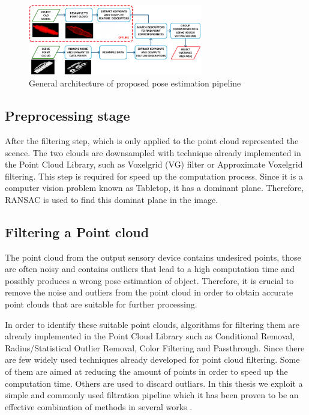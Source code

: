 \begin{figure}[!h]
\begin{center}
\includegraphics[width=3in]{figures03/pipeline.png}
\caption{General architecture of proposed pose estimation pipeline}%
\label{fig:pipeline}
\end{center}
\end{figure}







\subsection{Preprocessing stage}

After the filtering step, which is only applied to the point cloud represented the scence. The two clouds are downsampled with technique already implemented in the Point Cloud Library, such as Voxelgrid (VG) filter or Approximate Voxelgrid filtering. This step is required for speed up the computation process. 
Since it is a computer vision problem known as Tabletop, it has a dominant plane. Therefore, RANSAC is used to find this dominat plane in the image. 

\subsection{Filtering a Point cloud}
The point cloud from the output sensory device contains undesired points, those are often noisy and contains outliers that lead to a high computation time and possibly produces a wrong pose estimation of object. Therefore, it is crucial to remove the noise and outliers from the point cloud in order to obtain accurate point clouds that are suitable for further processing. 

In order to identify these suitable point clouds, algorithms for filtering them are already implemented in the Point Cloud Library such as Conditional Removal, Radius/Statistical Outlier Removal, Color Filtering and Passthrough. 
Since there are few widely used techniques already developed for point cloud filtering. Some of them are aimed at reducing the amount of points in order to speed up the computation time. Others are used to discard outliars. In this thesis we exploit a simple and commonly used filtration pipeline which it has been proven to be an effective combination of methods in several works \cite{algFiltering}.

